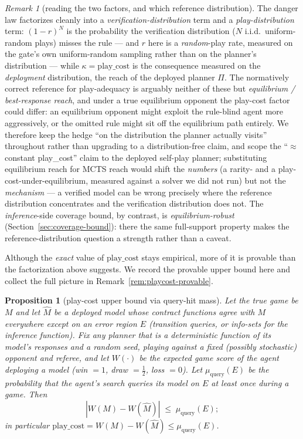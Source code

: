 \documentclass[11pt]{article}
\newtheorem{proposition}{Proposition}
\theoremstyle{remark}
\newtheorem{remark}{Remark}
\begin{document}
\begin{remark}[reading the two factors, and which reference distribution]
\label{rem:reference-dist}
The danger law factorizes cleanly into a \emph{verification-distribution} term and a \emph{play-distribution} term: $(1-r)^N$ is the probability the verification distribution ($N$ i.i.d.\ uniform-random plays) misses the rule --- and $r$ here is a \emph{random}-play rate, measured on the gate's own uniform-random sampling rather than on the planner's distribution --- while $\kappa = \mathrm{play\_cost}$ is the consequence measured on the \emph{deployment} distribution, the reach of the deployed planner $\Pi$. The normatively correct reference for play-adequacy is arguably neither of these but \emph{equilibrium / best-response reach}, and under a true equilibrium opponent the play-cost factor could differ: an equilibrium opponent might exploit the rule-blind agent more aggressively, or the omitted rule might sit off the equilibrium path entirely. We therefore keep the hedge ``on the distribution the planner actually visits'' throughout rather than upgrading to a distribution-free claim, and scope the ``$\approx$ constant play\_cost'' claim to the deployed self-play planner; substituting equilibrium reach for MCTS reach would shift the \emph{numbers} (a rarity- and a play-cost-under-equilibrium, measured against a solver we did not run) but not the \emph{mechanism} --- a verified model can be wrong precisely where the reference distribution concentrates and the verification distribution does not. The \emph{inference}-side coverage bound, by contrast, is \emph{equilibrium-robust} (Section~\ref{sec:coverage-bound}): there the same full-support property makes the reference-distribution question a strength rather than a caveat.
\end{remark}

Although the \emph{exact} value of $\mathrm{play\_cost}$ stays empirical, more of it is provable than the factorization above suggests. We record the provable upper bound here and collect the full picture in Remark~\ref{rem:playcost-provable}.

\begin{proposition}[play-cost upper bound via query-hit mass]
\label{prop:playcostbound}
Let the true game be $M$ and let $\hat M$ be a deployed model whose contract functions agree with $M$ everywhere except on an error region $E$ (transition queries, or info-sets for the inference function). Fix any planner that is a deterministic function of its model's responses and a random seed, playing against a fixed (possibly stochastic) opponent and referee, and let $W(\cdot)$ be the expected game score of the agent deploying a model (win $=1$, draw $=\tfrac12$, loss $=0$). Let $\mu_{\mathrm{query}}(E)$ be the probability that the agent's search queries its model on $E$ at least once during a game. Then
\[
|W(M) - W(\hat M)| \;\leq\; \mu_{\mathrm{query}}(E);
\]
in particular $\mathrm{play\_cost} = W(M) - W(\hat M) \leq \mu_{\mathrm{query}}(E)$.
\end{proposition}
\end{document}
